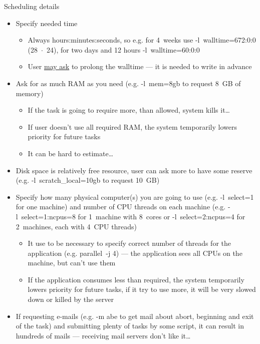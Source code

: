 \documentclass[compress, ucs, xelatex, 11pt, xcolor=x11names, aspectratio=169,
	hyperref={
		bookmarks=true,
		unicode=true,
		colorlinks=true,
		pdftitle={HybSeq course},
		plainpages=false,
		pdfauthor={Vojtech Zeisek},
		pdfsubject={Practical processing of HybSeq target enrichment sequencing data on computing grids like MetaCentrum},
		pdfcreator={XeLaTeX},
		pdfkeywords={BASH, command line, GNU, HybSeq, Linux, MetaCentrum, sequencing shell, target enrichment},
		linkcolor=Cyan2, %
		anchorcolor=Firebrick2, %
		citecolor=Firebrick2, %
		filecolor=Firebrick2, %
		menucolor=Firebrick2, %
		urlcolor=Chartreuse2, %
		pdftex},
	url={hyphens, lowtilde} %
	]{beamer}
\renewcommand{\texttt}[1]{\colorbox{Snow4}{{\ttfamily #1}}}
\begin{document}
\begin{frame}[allowframebreaks]{Scheduling details}
	\begin{itemize}
		\item Specify needed time
		\begin{itemize}
			\item Always \texttt{hours:minutes:seconds}, so e.g. for 4~weeks use \texttt{-l~walltime=672:0:0} (28~$\cdot$~24), for two days and 12 hours \texttt{-l~walltime=60:0:0}
			\item User \href{mailto:meta@cesnet.cz}{may ask} to prolong the walltime --- it is needed to write in advance
		\end{itemize}
		\item Ask for as much RAM as you need (e.g. \texttt{-l~mem=8gb} to request 8~GB of memory)
		\begin{itemize}
			\item If the task is going to require more, than allowed, system kills it\ldots
			\item If user doesn't use all required RAM, the system temporarily lowers priority for future tasks
			\item It can be hard to estimate\ldots
		\end{itemize}
		\item Disk space is relatively free resource, user can ask more to have some reserve (e.g. \texttt{-l~scratch\_local=10gb} to request 10~GB)
		\item Specify how many physical computer(s) you are going to use (e.g. \texttt{-l~select=1} for one machine) and number of CPU threads on each machine (e.g. \texttt{-l~select=1:ncpus=8} for 1~machine with 8~cores or \texttt{-l~select=2:ncpus=4} for 2~machines, each with 4~CPU threads)
		\begin{itemize}
			\item It use to be necessary to specify correct number of threads for the application (e.g. \texttt{parallel}~\texttt{-j 4}) --- the application sees all CPUs on the machine, but can't use them
			\item If the application consumes less than required, the system temporarily lowers priority for future tasks, if it try to use more, it will be very slowed down or killed by the server
		\end{itemize}
		\item If requesting e-mails (e.g. \texttt{-m abe} to get mail about abort, beginning and exit of the task) and submitting plenty of tasks by some script, it can result in hundreds of mails --- receiving mail servers don't like it\ldots

\end{itemize}
\end{frame}
\end{document}
